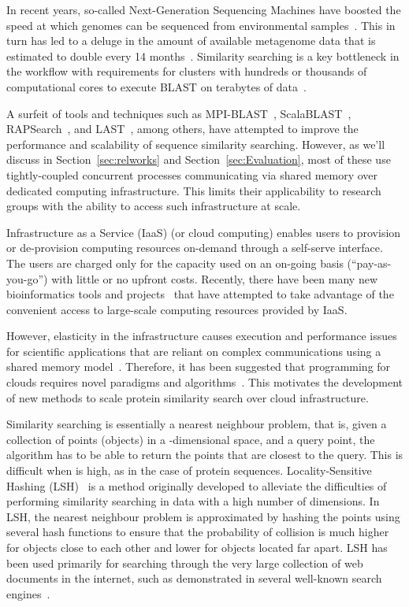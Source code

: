 \documentclass[titlepage]{csetr}
\begin{document}
In recent years, so-called Next-Generation Sequencing Machines have boosted the speed at which genomes can be sequenced from environmental samples~\cite{shendure_next-generation_2008,loman_high-throughput_2012}. This in turn has led to a deluge in the amount of available metagenome data that is estimated to double every 14 months~\cite{wooley_metagenomics_2010}. Similarity searching is a key bottleneck in the workflow with requirements for clusters with hundreds or thousands of computational cores to execute BLAST on terabytes of data~\cite{CAMERA}. 

A surfeit of tools and techniques such as MPI-BLAST~\cite{MPIBLAST,lin_coordinating_2011}, ScalaBLAST~\cite{oehmen_scalablast_2006}, RAPSearch~\cite{RAPSearch,RAPSearch2}, and LAST~\cite{LAST}, among others, have attempted to improve the performance and scalability of sequence similarity searching. However, as we'll discuss in Section~\ref{sec:relworks} and Section~\ref{sec:Evaluation}, most of these use tightly-coupled concurrent processes communicating via shared memory over dedicated computing infrastructure. This limits their applicability to research groups with the ability to access such infrastructure at scale.  

Infrastructure as a Service (IaaS) (or cloud computing) enables users to provision or de-provision computing resources on-demand through a self-serve interface. The users are charged only for the capacity used on an on-going basis (“pay-as-you-go”) with little or no upfront costs. Recently, there have been many new bioinformatics tools and projects~\cite{odriscoll_big_2013,CloudBLAST,wilkening_using_2009,wall_cloud_2010} that have attempted to take advantage of the convenient access to large-scale computing resources provided by IaaS. 

However, elasticity in the infrastructure causes execution and performance issues for scientific applications that are reliant on complex communications using a shared memory model~\cite{ekanayake_high_2010,he_case_2010}. Therefore, it has been suggested that programming for clouds requires novel paradigms and algorithms~\cite{larus_programming_2010}. This motivates the development of new methods to scale protein similarity search over cloud infrastructure.

Similarity searching is essentially a nearest neighbour problem, that is, given a collection of points (objects) in a -dimensional space, and a query point, the algorithm has to be able to return the points that are closest to the query. This is difficult when  is high, as in the case of protein sequences. Locality-Sensitive Hashing (LSH)~\cite{LSH} is a method originally developed to alleviate the difficulties of performing similarity searching in data with a high number of dimensions.  In LSH, the nearest neighbour problem is approximated by hashing the points using several hash functions to ensure that the probability of collision is much higher for objects close to each other and lower for objects located far apart.  LSH has been used primarily for searching through the very large collection of web documents in the internet, such as demonstrated in several well-known search engines~\cite{BroderWeb, Minhash, MankuSimhash}.
\end{document}
